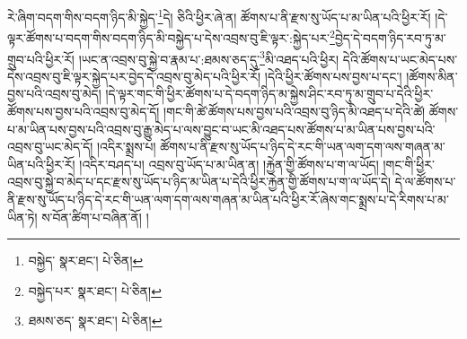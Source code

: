 རེ་ཞིག་བདག་གིས་བདག་ཉིད་མི་སྐྱེད་\footnote{བསྐྱེད་  སྣར་ཐང་།  པེ་ཅིན། }དེ། ཅིའི་ཕྱིར་ཞེ་ན། ཚོགས་པ་ནི་རྫས་སུ་ཡོད་པ་མ་ཡིན་པའི་ཕྱིར་རོ། །དེ་ལྟར་ཚོགས་པ་བདག་གིས་བདག་ཉིད་མི་བསྐྱེད་པ་དེས་འབྲས་བུ་ཇི་ལྟར་:སྐྱེད་པར་\footnote{བསྐྱེད་པར་  སྣར་ཐང་།  པེ་ཅིན། }བྱེད་དེ་བདག་ཉིད་རབ་ཏུ་མ་གྲུབ་པའི་ཕྱིར་རོ། །ཡང་ན་འབྲས་བུ་སྐྱེ་བ་རྣམ་པ་:ཐམས་ཅད་དུ་\footnote{ཐམས་ཅད་  སྣར་ཐང་།  པེ་ཅིན། }མི་འཐད་པའི་ཕྱིར། དེའི་ཚོགས་པ་ཡང་མེད་པས་དེས་འབྲས་བུ་ཇི་ལྟར་སྐྱེད་པར་བྱེད་དེ་འབྲས་བུ་མེད་པའི་ཕྱིར་རོ། །དེའི་ཕྱིར་ཚོགས་པས་བྱས་པ་དང་། །ཚོགས་མིན་བྱས་པའི་འབྲས་བུ་མེད། །དེ་ལྟར་གང་གི་ཕྱིར་ཚོགས་པ་དེ་བདག་ཉིད་མ་སྐྱེས་ཤིང་རབ་ཏུ་མ་གྲུབ་པ་དེའི་ཕྱིར་ཚོགས་པས་བྱས་པའི་འབྲས་བུ་མེད་དོ། །གང་གི་ཚེ་ཚོགས་པས་བྱས་པའི་འབྲས་བུ་ཉིད་མི་འཐད་པ་དེའི་ཚེ། ཚོགས་པ་མ་ཡིན་པས་བྱས་པའི་འབྲས་བུ་རྒྱུ་མེད་པ་ལས་བྱུང་བ་ཡང་མི་འཐད་པས་ཚོགས་པ་མ་ཡིན་པས་བྱས་པའི་འབྲས་བུ་ཡང་མེད་དོ། །འདིར་སྨྲས་པ། ཚོགས་པ་ནི་རྫས་སུ་ཡོད་པ་ཉིད་དེ་རང་གི་ཡན་ལག་དག་ལས་གཞན་མ་ཡིན་པའི་ཕྱིར་རོ། །འདིར་བཤད་པ། འབྲས་བུ་ཡོད་པ་མ་ཡིན་ན། །རྐྱེན་གྱི་ཚོགས་པ་ག་ལ་ཡོད། །གང་གི་ཕྱིར་འབྲས་བུ་སྐྱེ་བ་མེད་པ་དང་རྫས་སུ་ཡོད་པ་ཉིད་མ་ཡིན་པ་དེའི་ཕྱིར་རྐྱེན་གྱི་ཚོགས་པ་ག་ལ་ཡོད་དེ། དེ་ལ་ཚོགས་པ་ནི་རྫས་སུ་ཡོད་པ་ཉིད་དེ་རང་གི་ཡན་ལག་དག་ལས་གཞན་མ་ཡིན་པའི་ཕྱིར་རོ་ཞེས་གང་སྨྲས་པ་དེ་རིགས་པ་མ་ཡིན་ཏེ། ས་བོན་ཚིག་པ་བཞིན་ནོ། །
